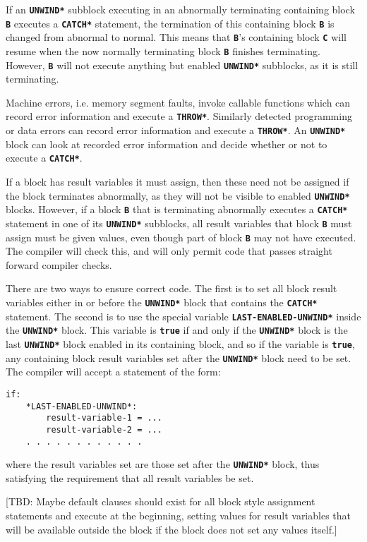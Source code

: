 \documentclass[12pt]{article}
\makeatletter
\newcommand{\TT}[1]{{\tt \bfseries #1}}
\newcommand{\ttakey}[1]{\TT{*#1*}\index{#1@{\tt *#1*}}}
\newenvironment{indpar}[1][0.3in]%
	{\begin{list}{}%
		     {\setlength{\itemsep}{0in}%
		      \setlength{\topsep}{0in}%
		      \setlength{\parsep}{1ex}%
		      \setlength{\labelwidth}{#1}%
		      \setlength{\leftmargin}{#1}%
		      \addtolength{\leftmargin}{\labelsep}}%
	 \item}%
	{\end{list}}
\makeatother
\begin{document}
If an \TT{*UNWIND*} subblock executing in an abnormally terminating
containing block \TT{B}
executes a \TT{*CATCH*} statement, the termination of this
containing block \TT{B}
is changed from abnormal to normal.  This means
that \TT{B}'s containing block \TT{C} will resume when the now
normally terminating block \TT{B} finishes terminating.
However, \TT{B} will not execute anything but enabled \TT{*UNWIND*}
subblocks, as it is still terminating.

Machine errors, i.e. memory segment faults, invoke callable functions
which can record error information and execute a \TT{*THROW*}.
Similarly detected programming or data errors can record
error information and execute a \TT{*THROW*}.  An \TT{*UNWIND*}
block can look at recorded error information and decide whether
or not to execute a \TT{*CATCH*}.

If a block has result variables it must assign, then these need not be
assigned if the block terminates abnormally, as they will not
be visible to enabled \TT{*UNWIND*} blocks.  However, if a block \TT{B}
that is terminating abnormally executes a \TT{*CATCH*} statement in
one of its \TT{*UNWIND*} subblocks,
all result variables that block \TT{B} must assign must be given values, even
though part of block \TT{B} may not have executed.  The compiler
will check this, and will only permit code that passes straight forward
compiler checks.

There are two ways to ensure correct code.  The first is to 
set all block result variables either in or before the
\TT{*UNWIND*} block that contains the \TT{*CATCH*} statement.
The second is to use the special variable
\ttakey{LAST-ENABLED-UNWIND} inside the \TT{*UNWIND*} block.
This variable is \TT{true} if and only if the \TT{*UNWIND*}
block is the last \TT{*UNWIND*} block enabled in its containing
block, and so if the variable is \TT{true}, any containing
block result variables set after the \TT{*UNWIND*} block need to be
set.  The compiler will accept a statement of the form:
\begin{indpar}\begin{verbatim}
if:
    *LAST-ENABLED-UNWIND*:
        result-variable-1 = ...
        result-variable-2 = ...
	. . . . . . . . . . . .
\end{verbatim}\end{indpar}
where the result variables set are those set after the \TT{*UNWIND*}
block, thus satisfying the requirement that all result variables be set.

[TBD: Maybe default clauses should exist for all block style
assignment statements and execute at the beginning, setting
values for result variables that will be available outside
the block if the block does not set any values itself.]
\end{document}
